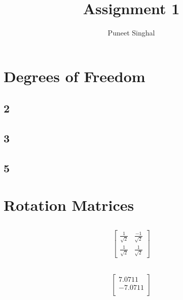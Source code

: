 \documentclass[fleqn]{article}
\title{Assignment 1}
\author{Puneet Singhal}
\date{}
\begin{document}
\maketitle
{}



\section{Degrees of Freedom}

\subsection{2}
\subsection{3}
\subsection{5}
	
\section{Rotation Matrices}

\subsection{ }
	\begin{adjustwidth}{4em}{0pt}
	\begin{equation*}
	\left[
	\begin{matrix}
	\frac{1}{\sqrt{2}} & \frac{-1}{\sqrt{2}} \\
	\frac{1}{\sqrt{2}} & \frac{1}{\sqrt{2}}
	\end{matrix}
	\right]
	\end{equation*}
	\end{adjustwidth}

\subsection{ }
	\begin{adjustwidth}{4em}{0pt}
	\begin{align*}
	\left[
	\begin{matrix}
	 7.0711\\-7.0711\\
	\end{matrix}
	\right]
	\end{align*}
	\end{adjustwidth}
\end{document}
